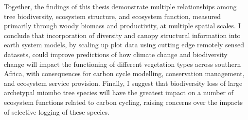 Together, the findings of this thesis demonstrate multiple relationships among tree biodiversity, ecosystem structure, and ecosystem function, measured primarily through woody biomass and productivity, at multiple spatial scales. I conclude that incorporation of diversity and canopy structural information into earth system models, by scaling up plot data using cutting edge remotely sensed datasets, could improve predictions of how climate change and biodiversity change will impact the functioning of different vegetation types across southern Africa, with consequences for carbon cycle modelling, conservation management, and ecosystem service provision. Finally, I suggest that biodiversity loss of large archetypal miombo tree species will have the greatest impact on a number of ecosystem functions related to carbon cycling, raising concerns over the impacts of selective logging of these species.

